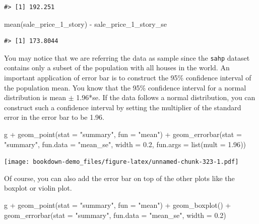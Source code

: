 \documentclass[
]{book}
\newenvironment{Shaded}{\begin{snugshade}}{\end{snugshade}}
\newcommand{\AttributeTok}[1]{\textcolor[rgb]{0.77,0.63,0.00}{#1}}
\newcommand{\FloatTok}[1]{\textcolor[rgb]{0.00,0.00,0.81}{#1}}
\newcommand{\FunctionTok}[1]{\textcolor[rgb]{0.00,0.00,0.00}{#1}}
\newcommand{\NormalTok}[1]{#1}
\newcommand{\SpecialCharTok}[1]{\textcolor[rgb]{0.00,0.00,0.00}{#1}}
\newcommand{\StringTok}[1]{\textcolor[rgb]{0.31,0.60,0.02}{#1}}
\begin{document}
\begin{verbatim}
#> [1] 192.251
\end{verbatim}

\begin{Shaded}
\begin{Highlighting}[]
\FunctionTok{mean}\NormalTok{(sale\_price\_1\_story) }\SpecialCharTok{{-}}\NormalTok{ sale\_price\_1\_story\_se}
\end{Highlighting}
\end{Shaded}

\begin{verbatim}
#> [1] 173.8044
\end{verbatim}

You may notice that we are referring the data as sample since the \texttt{sahp} dataset contains only a subset of the population with all houses in the world. An important application of error bar is to construct the 95\% confidence interval of the population mean. You know that the 95\% confidence interval for a normal distribution is mean \(\pm\) 1.96*se. If the data follows a normal distribution, you can construct such a confidence interval by setting the multiplier of the standard error in the error bar to be 1.96.

\begin{Shaded}
\begin{Highlighting}[]
\NormalTok{g  }\SpecialCharTok{+} \FunctionTok{geom\_point}\NormalTok{(}\AttributeTok{stat =} \StringTok{"summary"}\NormalTok{, }\AttributeTok{fun =} \StringTok{"mean"}\NormalTok{) }\SpecialCharTok{+} 
  \FunctionTok{geom\_errorbar}\NormalTok{(}\AttributeTok{stat =} \StringTok{"summary"}\NormalTok{, }\AttributeTok{fun.data =} \StringTok{"mean\_se"}\NormalTok{, }\AttributeTok{width =} \FloatTok{0.2}\NormalTok{, }\AttributeTok{fun.args =} \FunctionTok{list}\NormalTok{(}\AttributeTok{mult =} \FloatTok{1.96}\NormalTok{))}
\end{Highlighting}
\end{Shaded}

\texttt{[image: bookdown-demo\_files/figure-latex/unnamed-chunk-323-1.pdf]}

Of course, you can also add the error bar on top of the other plots like the boxplot or violin plot.

\begin{Shaded}
\begin{Highlighting}[]
\NormalTok{g  }\SpecialCharTok{+} \FunctionTok{geom\_point}\NormalTok{(}\AttributeTok{stat =} \StringTok{"summary"}\NormalTok{, }\AttributeTok{fun =} \StringTok{"mean"}\NormalTok{) }\SpecialCharTok{+} 
  \FunctionTok{geom\_boxplot}\NormalTok{() }\SpecialCharTok{+}
  \FunctionTok{geom\_errorbar}\NormalTok{(}\AttributeTok{stat =} \StringTok{"summary"}\NormalTok{, }\AttributeTok{fun.data =} \StringTok{"mean\_se"}\NormalTok{, }\AttributeTok{width =} \FloatTok{0.2}\NormalTok{)}
\end{Highlighting}
\end{Shaded}
\end{document}
